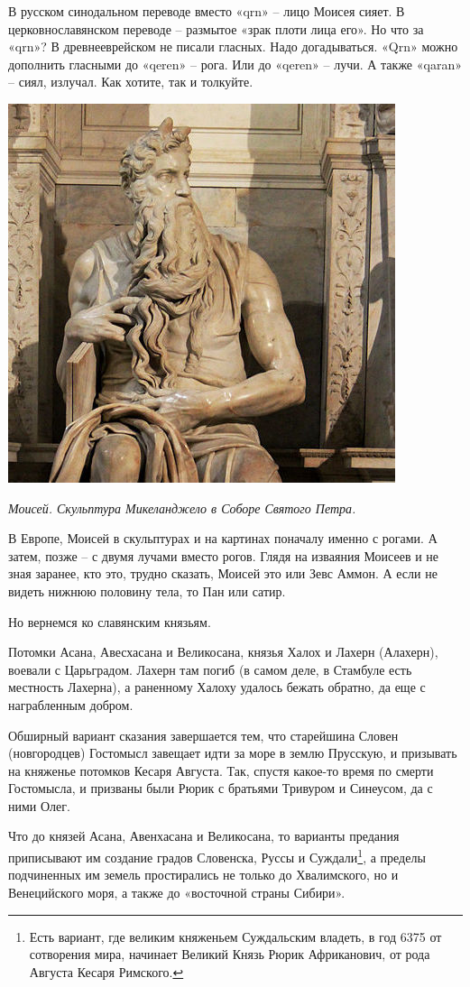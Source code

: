 В русском синодальном переводе вместо «qrn» – лицо Моисея сияет. В церковнославянском переводе – размытое «зрак плоти лица его». Но что за «qrn»? В древнееврейском не писали гласных. Надо догадываться. «Qrn» можно дополнить гласными до  «qeren» – рога. Или до «qeren» – лучи. А также «qaran» – сиял, излучал. Как хотите, так и толкуйте.

\begin{center}
\includegraphics[width=0.60\linewidth]{chast-colebanie-osnov/polane/s-663px-San_Pietro_in_Vincoli_Rome_2011_14.jpg}

\textit{Моисей. Скульптура Микеланджело в Соборе Святого Петра.}
\end{center} 

В Европе, Моисей в скульптурах и на картинах поначалу именно с рогами. А затем, позже – с двумя лучами вместо рогов. Глядя на изваяния Моисеев и не зная заранее, кто это, трудно сказать, Моисей это или Зевс Аммон. А если не видеть нижнюю половину тела, то Пан или сатир.

Но вернемся ко славянским князьям.

Потомки Асана, Авесхасана и Великосана, князья Халох и Лахерн (Алахерн), воевали с Царьградом. Лахерн там погиб (в самом деле, в Стамбуле есть местность Лахерна), а раненному Халоху удалось бежать обратно, да еще с награбленным добром.

Обширный вариант сказания завершается тем, что старейшина Словен (новгородцев) Гостомысл завещает идти за море в землю Прусскую, и призывать на княженье потомков Кесаря Августа. Так, спустя какое-то время по смерти Гостомысла, и призваны были Рюрик с братьями Тривуром и Синеусом, да с ними Олег.

Что до князей Асана, Авенхасана и Великосана, то варианты предания приписывают им создание градов Словенска, Руссы и Суждали\footnote{Есть вариант, где великим княженьем Суждальским владеть, в год 6375 от сотворения мира, начинает Великий Князь Рюрик Африканович, от рода Августа Кесаря Римского.}, а пределы подчиненных им земель простирались не только до Хвалимского, но и Венецийского моря, а также до «восточной страны Сибири». 

